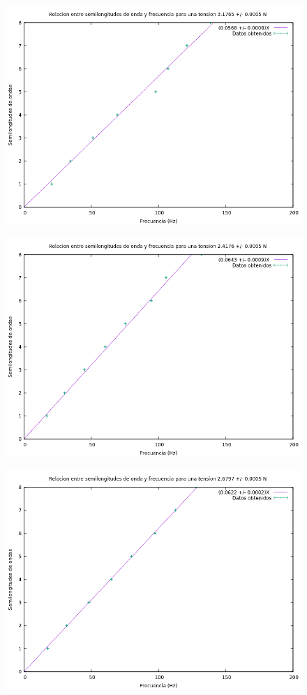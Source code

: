 \documentclass[10pt,a4paper]{article}
\begin{document}
\begin{figure}[H]
\includegraphics[scale=0.65]{5.png}
\centering
\end{figure}

\begin{figure}[H]
\includegraphics[scale=0.65]{6.png}
\centering
\end{figure}

\begin{figure}[H]
\includegraphics[scale=0.65]{7.png}
\centering
\end{figure}
\end{document}
